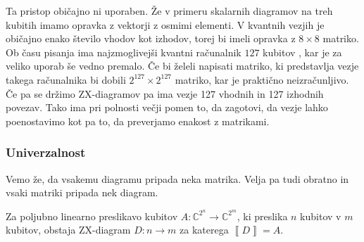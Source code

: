\documentclass[mat1]{fmfdelo}
\newcommand{\C}{\mathbb C}
\newcommand{\interpret}[1]{\left\llbracket #1 \right\rrbracket}
\begin{document}
Ta pristop običajno ni uporaben. Že v primeru skalarnih diagramov na treh kubitih imamo opravka z vektorji z osmimi elementi. V kvantnih vezjih je običajno enako število vhodov kot izhodov, torej bi imeli opravka z \(8\times8\) matriko. Ob času pisanja ima najzmoglivejši kvantni računalnik \(127\) kubitov \cite{hugh}, kar je za veliko uporab še vedno premalo. Če bi želeli napisati matriko, ki predstavlja vezje takega računalnika bi dobili \(2^{127}\times 2^{127}\) matriko, kar je praktično neizračunljivo. Če pa se držimo ZX-diagramov pa ima vezje 127 vhodnih in 127 izhodnih povezav. Tako ima pri polnosti večji pomen to, da zagotovi, da vezje lahko poenostavimo kot pa to, da preverjamo enakost z matrikami.
\subsubsection{Univerzalnost}
Vemo že, da vsakemu diagramu pripada neka matrika. Velja pa tudi obratno in vsaki matriki pripada nek diagram.
\begin{izrek}[Univerzalnost]
    Za poljubno linearno preslikavo kubitov \(A:\C^{2^n}\to \C^{2^m}\), ki preslika \(n\) kubitov v \(m\) kubitov, obstaja ZX-diagram \(D:n\to m\) za katerega \(\interpret{D}=A\).
\end{izrek}
\end{document}
